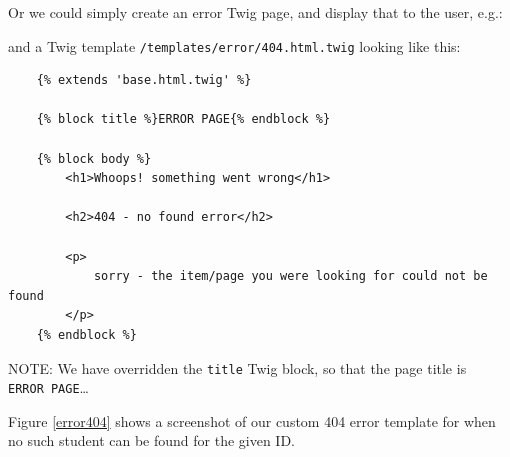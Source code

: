 \documentclass[a4paperpaper,openright]{book}
\newenvironment{Shaded}{}{}
\newcommand{\KeywordTok}[1]{\textcolor[rgb]{0.00,0.44,0.13}{\textbf{#1}}}
\newcommand{\NormalTok}[1]{#1}
\newcommand{\OtherTok}[1]{\textcolor[rgb]{0.00,0.44,0.13}{#1}}
\newcommand{\StringTok}[1]{\textcolor[rgb]{0.25,0.44,0.63}{#1}}
\begin{document}
Or we could simply create an error Twig page, and display that to the
user, e.g.:

\begin{Shaded}
\end{Shaded}

and a Twig template \texttt{/templates/error/404.html.twig} looking like
this:

\begin{verbatim}
    {% extends 'base.html.twig' %}
    
    {% block title %}ERROR PAGE{% endblock %}

    {% block body %}
        <h1>Whoops! something went wrong</h1>

        <h2>404 - no found error</h2>

        <p>
            sorry - the item/page you were looking for could not be found
        </p>
    {% endblock %}
\end{verbatim}

NOTE: We have overridden the \texttt{title} Twig block, so that the page
title is \texttt{ERROR\ PAGE}\ldots{}

Figure \ref{error404} shows a screenshot of our custom 404 error
template for when no such student can be found for the given ID.
\end{document}
